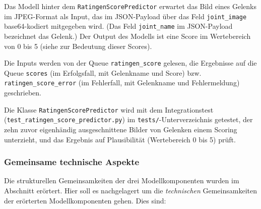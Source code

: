 Das Modell hinter dem \texttt{RatingenScorePredictor} erwartet das Bild eines Gelenks im JPEG-Format als Input, das im JSON-Payload über das Feld \texttt{joint\_image} base64-kodiert mitgegeben wird. (Das Feld \texttt{joint\_name} im JSON-Payload bezeichnet das Gelenk.) Der Output des Modells ist eine Score im Wertebereich von 0 bis 5 (siehe  zur Bedeutung dieser Scores).

Die Inputs werden von der Queue \texttt{ratingen\_score} gelesen, die Ergebnisse auf die Queue \texttt{scores} (im Erfolgsfall, mit Gelenkname und Score) bzw. \texttt{ratingen\_score\_error} (im Fehlerfall, mit Gelenkname und Fehlermeldung) geschrieben.

Die Klasse \texttt{RatingenScorePredictor} wird mit dem Integrationstest (\texttt{test\_ratingen\_score\_predictor.py}) im \texttt{tests/}-Unterverzeichnis getestet, der zehn zuvor eigenhändig ausgeschnittene Bilder von Gelenken einem Scoring unterzieht, und das Ergebnis auf Plausibilität (Wertebereich 0 bis 5) prüft.

\subsubsection{Gemeinsame technische Aspekte}
\label{sec:gemeinsame-technische-aspekte}

Die strukturellen Gemeinsamkeiten der drei Modellkomponenten wurden im Abschnitt   erörtert. Hier soll es nachgelagert um die \textit{technischen} Gemeinsamkeiten der erörterten Modellkomponenten gehen. Dies sind:


